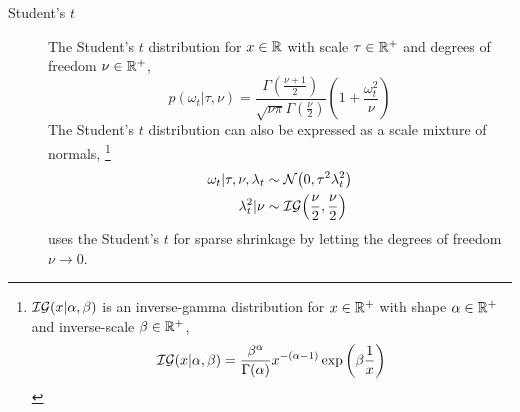 \begin{description}

\item[Student's $t$] The Student's $t$ distribution for $x \in \mathbb{R}$  with scale $\tau \in \mathbb{R}^{+}$ and degrees of freedom $\nu \in \mathbb{R}^{+}$,
\begin{equation}
  \label{dlm:eq:6}
  p(\omega_{t} | \tau, \nu) = \frac{\Gamma\left(\frac{\nu + 1}{2}\right)}{\sqrt{\nu \pi} \Gamma\left( \frac{\nu}{2} \right)} \left( 1 + \frac{\omega_{t}^{2}}{\nu} \right)
\end{equation}
The Student's $t$ distribution can also be expressed as a scale mixture of normals,%
\footnote{
  $\mathcal{IG}\mathopen{}\left(x | \alpha, \beta\right)\mathclose{}$ is an inverse-gamma distribution for $x \in \mathbb{R}^{+}$ with shape $\alpha \in \mathbb{R}^{+}$ and inverse-scale $\beta \in \mathbb{R}^{+}$,
  \begin{equation}
    \label{dlm:eq:9}
    \mathcal{IG}\mathopen{}\left(x | \alpha, \beta\right)\mathclose{} = \frac{\beta^{\alpha}}{\Gamma(\alpha)} x^{-(\alpha - 1)} \exp 
    \left(
      \beta \frac{1}{x}
    \right)
  \end{equation}
}
\begin{equation}
  \label{dlm:eq:5}
  \begin{aligned}[t]
  \omega_{t} | \tau, \nu, \lambda_{t} &\sim \mathcal{N}\mathopen{}\left(0, \tau^{2} \lambda_{t}^{2}\right)\mathclose{} \\
  \lambda_{t}^{2} | \nu & \sim \mathcal{IG}\mathopen{}\left(\frac{\nu}{2}, \frac{\nu}{2}\right)\mathclose{}
  \end{aligned}
\end{equation}
\parencite{Tipping2001} uses the Student's $t$ for sparse shrinkage by letting the degrees of freedom $\nu \to 0$.


\end{description}
